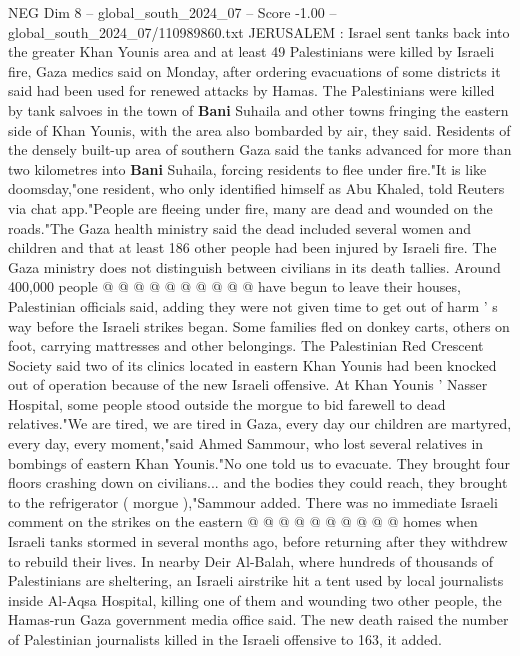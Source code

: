 \begin{textsample}{NEG Dim 8 – global\_south\_2024\_07 – Score -1.00 – global\_south\_2024\_07/110989860.txt}  \label{ex:f8_neg_351}
JERUSALEM : Israel sent tanks back into the greater Khan Younis area and at least 49 Palestinians were killed by Israeli fire, Gaza medics said on Monday, after ordering evacuations of some districts it said had been used for renewed attacks by Hamas.
The Palestinians were killed by tank salvoes in the town of \textbf{Bani} Suhaila and other towns fringing the eastern side of Khan Younis, with the area also bombarded by air, they said.
Residents of the densely built-up area of southern Gaza said the tanks advanced for more than two kilometres into \textbf{Bani} Suhaila, forcing residents to flee under fire."It is like doomsday,"one resident, who only identified himself as Abu Khaled, told Reuters via chat app."People are fleeing under fire, many are dead and wounded on the roads."The Gaza health ministry said the dead included several women and children and that at least 186 other people had been injured by Israeli fire.
The Gaza ministry does not distinguish between civilians in its death tallies.
Around 400,000 people @ @ @ @ @ @ @ @ @ @ have begun to leave their houses, Palestinian officials said, adding they were not given time to get out of harm ' s way before the Israeli strikes began.
Some families fled on donkey carts, others on foot, carrying mattresses and other belongings.
The Palestinian Red Crescent Society said two of its clinics located in eastern Khan Younis had been knocked out of operation because of the new Israeli offensive.
At Khan Younis ' Nasser Hospital, some people stood outside the morgue to bid farewell to dead relatives."We are tired, we are tired in Gaza, every day our children are martyred, every day, every moment,"said Ahmed Sammour, who lost several relatives in bombings of eastern Khan Younis."No one told us to evacuate.
They brought four floors crashing down on civilians... and the bodies they could reach, they brought to the refrigerator ( morgue ),"Sammour added.
There was no immediate Israeli comment on the strikes on the eastern @ @ @ @ @ @ @ @ @ @ homes when Israeli tanks stormed in several months ago, before returning after they withdrew to rebuild their lives.
In nearby Deir Al-Balah, where hundreds of thousands of Palestinians are sheltering, an Israeli airstrike hit a tent used by local journalists inside Al-Aqsa Hospital, killing one of them and wounding two other people, the Hamas-run Gaza government media office said.
The new death raised the number of Palestinian journalists killed in the Israeli offensive to 163, it added.

\end{textsample}
